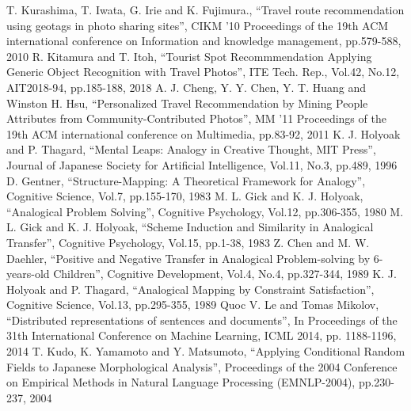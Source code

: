 \documentclass[journal]{IAENGtran}
\begin{document}
\ifCLASSOPTIONcaptionsoff
  \newpage
\fi

\begin{thebibliography}{1}
    T. Kurashima, T. Iwata, G. Irie and K. Fujimura.,
      ``Travel route recommendation using geotags in photo sharing sites'',
      CIKM '10 Proceedings of the 19th ACM international conference on Information and knowledge management, pp.579-588, 2010
    R. Kitamura and T. Itoh,
      ``Tourist Spot Recommmendation Applying Generic Object Recognition with Travel Photos'',
      ITE Tech. Rep., Vol.42, No.12, AIT2018-94, pp.185-188, 2018
    A. J. Cheng, Y. Y. Chen, Y. T. Huang and Winston H. Hsu,
      ``Personalized Travel Recommendation by Mining People Attributes from Community-Contributed Photos'',
      MM '11 Proceedings of the 19th ACM international conference on Multimedia, pp.83-92, 2011
    K. J. Holyoak and P. Thagard,
      ``Mental Leaps: Analogy in Creative Thought, MIT Press'',
      Journal of Japanese Society for Artificial Intelligence,  Vol.11, No.3,  pp.489, 1996
    D. Gentner,
      ``Structure-Mapping: A Theoretical Framework for Analogy'',
      Cognitive Science, Vol.7, pp.155-170, 1983
    M. L. Gick and K. J. Holyoak,
      ``Analogical Problem Solving'',
      Cognitive Psychology, Vol.12, pp.306-355, 1980
    M. L. Gick and K. J. Holyoak,
      ``Scheme Induction and Similarity in Analogical Transfer'',
      Cognitive Psychology, Vol.15, pp.1-38, 1983
    Z. Chen and M. W. Daehler,
      ``Positive and Negative Transfer in Analogical Problem-solving by 6-years-old Children'',
      Cognitive Development, Vol.4, No.4, pp.327-344, 1989
    K. J. Holyoak and P. Thagard,
      ``Analogical Mapping by Constraint Satisfaction'',
      Cognitive Science, Vol.13, pp.295-355, 1989
    Quoc V. Le and Tomas Mikolov,
      ``Distributed representations of sentences and documents'',
      In Proceedings of the 31th International Conference on Machine Learning, ICML 2014, pp. 1188-1196, 2014
    T. Kudo, K. Yamamoto and Y. Matsumoto,
    ``Applying Conditional Random Fields to Japanese Morphological Analysis'',
    Proceedings of the 2004 Conference on Empirical Methods in Natural Language Processing (EMNLP-2004), pp.230-237, 2004

\end{thebibliography}
\end{document}
